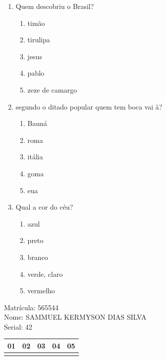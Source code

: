 \documentclass[10pt,a4paper,twocolumn]{report}
\begin{document}
 \begin{enumerate} 
    \item  Quem descobriu o Brasil?





    \begin{enumerate}
    \item  timão

\item  tirulipa

\item  jesus

\item  pablo

\item  zeze de camargo


    \end{enumerate} 
    \item  segundo o ditado popular quem tem boca vai à?





    \begin{enumerate}
    \item  Bauná

\item  roma

\item  itália

\item  goma

\item  eua


    \end{enumerate} 
    \item  Qual a cor do céu?





    \begin{enumerate}
    \item  azul

\item  preto

\item  branco

\item  verde, claro

\item  vermelho


    \end{enumerate}\end{enumerate} 
Matrícula: 565544\\ Nome: SAMMUEL KERMYSON DIAS SILVA \\ Serial: 42\\
\begin{tabular}{|l|l|l|l|l|}\hline
01  &02  &03  &04  &05 \\ \hline 
 & & & & \\ \hline 
\end{tabular}
 \cleardoublepage 
\end{document}
